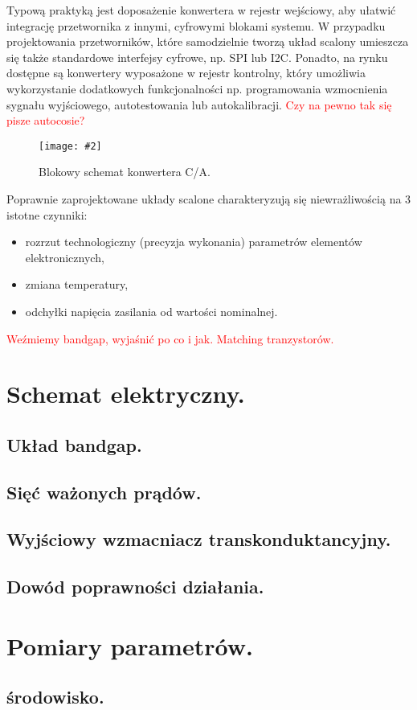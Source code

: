 \documentclass[10pt,a4paper]{report}
\newcommand{\img}[4]{
	\begin{figure}[H]
		\begin{center}
			\texttt{[image: \#2]}
			\caption{#3}
			\label{#4}
		\end{center}
	\end{figure}
}
\begin{document}
	{	Typową praktyką jest doposażenie konwertera w rejestr wejściowy, aby ułatwić integrację przetwornika z innymi, cyfrowymi blokami systemu. W przypadku projektowania przetworników, które samodzielnie tworzą układ scalony umieszcza się także standardowe interfejsy cyfrowe, np. SPI lub I2C. Ponadto, na rynku dostępne są konwertery wyposażone w rejestr kontrolny, który umożliwia wykorzystanie dodatkowych funkcjonalności np. programowania wzmocnienia sygnału wyjściowego, autotestowania lub autokalibracji. \textcolor{red}{Czy na pewno tak się pisze autocosie?}
		\img{20}{../visio/blokschkonca.pdf}{Blokowy schemat konwertera C/A.}{blokschkonca} }

	{	Poprawnie zaprojektowane układy scalone charakteryzują się niewrażliwością na 3 istotne czynniki:
		\begin{itemize}
			\item rozrzut technologiczny (precyzja wykonania) parametrów elementów elektronicznych,
			\item zmiana temperatury,
			\item odchyłki napięcia zasilania od wartości nominalnej.
		\end{itemize}
		\textcolor{red}{Weźmiemy bandgap, wyjaśnić po co i jak. Matching tranzystorów.}	}

	\chapter{Schemat elektryczny.}
	\section{Układ bandgap.}
	\section{Sięć ważonych prądów.}
	\section{Wyjściowy wzmacniacz transkonduktancyjny.}

	\section{Dowód poprawności działania.}

	\chapter{Pomiary parametrów.}
	\section{środowisko.}
\end{document}
